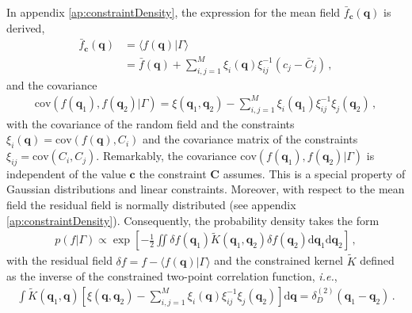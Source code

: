 \documentclass[a4paper, 11pt]{article}
\begin{document}
\bigskip
\noindent In appendix \ref{ap:constraintDensity}, the expression for the mean field $\bar{f}_{\bm{c}}(\bm{q})$ is derived, 
\begin{align}
\bar{f}_{\bm{c}}(\bm{q})&=\langle f(\bm{q})|\Gamma\rangle \nonumber \\
&= \bar{f}(\bm{q}) + \sum_{i,j=1}^M\xi_i (\bm{q})\xi_{ij}^{-1}(c_j-\bar{C}_j)\,,
\end{align}
and the covariance
\begin{align}
\text{cov}(f(\bm{q}_1),f(\bm{q}_2)|\Gamma)  = \xi(\bm{q}_1,\bm{q}_2) - \sum_{i,j=1}^M\xi_i(\bm{q}_1)\xi_{ij}^{-1}\xi_j(\bm{q}_2)\,,
\end{align}
with the covariance of the random field and the constraints $\xi_{i}(\bm{q}) = \text{cov}( f(\bm{q}), C_i)$ and the covariance matrix of the constraints $\xi_{ij} = \text{cov}( C_i ,C_j)$. Remarkably, the covariance $\text{cov}(f(\bm{q}_1),f(\bm{q}_2)|\Gamma)$ is independent of the value $\bm{c}$ the constraint $\bm{C}$ assumes. This is a special property of Gaussian distributions and linear constraints. Moreover, with respect to the mean field the residual field is normally distributed (see appendix \ref{ap:constraintDensity}). Consequently, the probability density takes the form
\begin{align}
p( f|\Gamma) \propto  \exp\left[-\frac{1}{2} \iint \delta{f}(\bm{q}_1) \tilde{K}(\bm{q}_1,\bm{q}_2) \delta f(\bm{q}_2)\mathrm{d}\bm{q}_1 \mathrm{d}\bm{q}_2 \right]\,,\label{eq:constraint2}
\end{align}
with the residual field $\delta f = f-\langle f(\bm{q})|\Gamma\rangle$ and the constrained kernel $\tilde{K}$ defined as the inverse of the constrained two-point correlation function, \textit{i.e.},
\begin{align}
\int \tilde{K}(\bm{q}_1,\bm{q}) \left[\xi(\bm{q},\bm{q}_2) - \sum_{i,j=1}^M\xi_i(\bm{q})\xi_{ij}^{-1}\xi_j(\bm{q}_2)\right]\mathrm{d}\bm{q}= \delta_D^{(2)}(\bm{q}_1-\bm{q}_2)\,.
\end{align}
\end{document}
